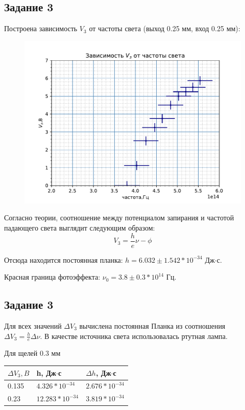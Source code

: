 \subsection{Задание 3}
Построена зависимость $V_3$ от частоты света (выход 0.25 мм, вход 0.25 мм):
\begin{figure}[H]
	\centering
	\includegraphics[scale=1]{scripts/z3.pdf}
	\caption{}
	\label{fig:13}
\end{figure}
Согласно теории, соотношение между потенциалом запирания и частотой падающего света выглядит следующим образом: $$V_{3}=\frac he \nu-\phi$$

Отсюда находится постоянная планка: $h=6.032\pm 1.542*10^{-34}$ Дж$\cdot$с.

Красная граница фотоэффекта: $\nu_0=3.8\pm 0.3*10^{14} \text{ Гц}$.

\subsection{Задание 3}
Для всех значений $\Delta V_3$ вычислена постоянная Планка из соотношения $\Delta V_{3}=\frac he \Delta \nu$. В качестве источника света использовалась ртутная лампа.

Для щелей 0.3 мм

\begin{tabular}{ | l | l | l |}
\hline
$\Delta V_3, B$ & h, Дж$\cdot$с & $\Delta h$, Дж$\cdot$с \\ \hline
0.135 & $4.326*10^{-34}$ & $2.676*10^{-34}$ \\
0.23 & $12.283*10^{-34}$ & $3.819*10^{-34}$ \\
\hline
\end{tabular}

